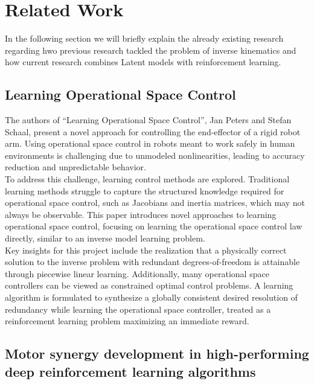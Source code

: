 \chapter{Related Work}\label{chap:relatedwork}

In the following section we will briefly explain the already existing research regarding hwo previous research tackled the problem of inverse kinematics and how current research combines Latent models with reinforcement learning.

\section{Learning Operational Space Control}

The authors of ``Learning Operational Space Control''\cite{Learning_to_Control_in_Operational_Space}, Jan Peters and Stefan Schaal, present a novel approach for controlling the end-effector of a rigid robot arm. Using operational space control in robots meant to work safely in human environments is challenging due to unmodeled nonlinearities, leading to accuracy reduction and unpredictable behavior.\\
To address this challenge, learning control methods are explored. Traditional learning methods struggle to capture the structured knowledge required for operational space control, such as Jacobians and inertia matrices, which may not always be observable. This paper introduces novel approaches to learning operational space control, focusing on learning the operational space control law directly, similar to an inverse model learning problem. \\
Key insights for this project include the realization that a physically correct solution to the inverse problem with redundant degrees-of-freedom is attainable through piecewise linear learning. Additionally, many operational space controllers can be viewed as constrained optimal control problems. A learning algorithm is formulated to synthesize a globally consistent desired resolution of redundancy while learning the operational space controller, treated as a reinforcement learning problem maximizing an immediate reward.

\section{Motor synergy development in high-performing deep reinforcement learning algorithms}

